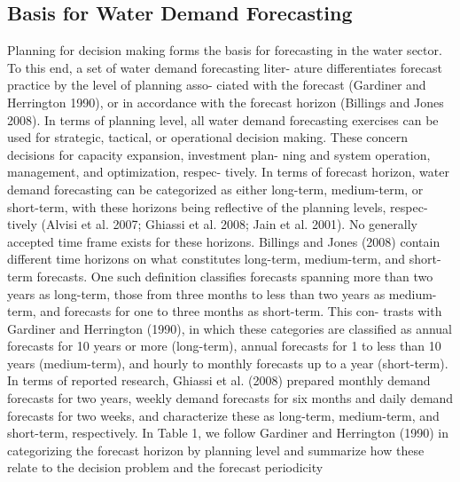 \documentclass[a4paper,12pt]{llncs}
\begin{document}
\subsection{Basis for Water Demand Forecasting}
Planning for decision making forms the basis for forecasting in the
water sector. To this end, a set of water demand forecasting liter-
ature differentiates forecast practice by the level of planning asso-
ciated with the forecast (Gardiner and Herrington 1990), or in
accordance with the forecast horizon (Billings and Jones 2008).
In terms of planning level, all water demand forecasting exercises
can be used for strategic, tactical, or operational decision making.
These concern decisions for capacity expansion, investment plan-
ning and system operation, management, and optimization, respec-
tively. In terms of forecast horizon, water demand forecasting can
be categorized as either long-term, medium-term, or short-term,
with these horizons being reflective of the planning levels, respec-
tively (Alvisi et al. 2007; Ghiassi et al. 2008; Jain et al. 2001).
No generally accepted time frame exists for these horizons.
Billings and Jones (2008) contain different time horizons on what
constitutes long-term, medium-term, and short-term forecasts. One
such definition classifies forecasts spanning more than two years as
long-term, those from three months to less than two years as medium-
term, and forecasts for one to three months as short-term. This con-
trasts with Gardiner and Herrington (1990), in which these categories
are classified as annual forecasts for 10 years or more (long-term),
annual forecasts for 1 to less than 10 years (medium-term), and hourly
to monthly forecasts up to a year (short-term). In terms of reported
research, Ghiassi et al. (2008) prepared monthly demand forecasts
for two years, weekly demand forecasts for six months and daily
demand forecasts for two weeks, and characterize these as long-term,
medium-term, and short-term, respectively. In Table 1, we follow
Gardiner and Herrington (1990) in categorizing the forecast horizon
by planning level and summarize how these relate to the decision
problem and the forecast periodicity
\end{document}
